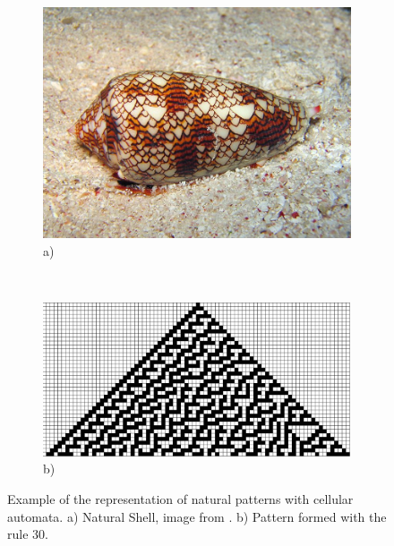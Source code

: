 \begin{figure}
        \centering
        \begin{subfigure}[b]{0.3\textwidth}
                \includegraphics[width=\textwidth]{img/Theory/Cellular_A/shell.jpeg}
                \caption{a)}
				\label{fig:CAshell}
        \end{subfigure}%
          ~~
        \begin{subfigure}[b]{0.5\textwidth}
                \includegraphics[width=\textwidth]{img/Theory/Cellular_A/Rule30.png}
				\caption{b)}
				\label{fig:CArule30}
        \end{subfigure}
        \caption{Example of the representation of natural patterns with cellular automata. a) Natural Shell, image from \cite{Shiffman2012}. b) Pattern formed with the rule 30.}
		\label{fig:CArule30shell}
\end{figure}



